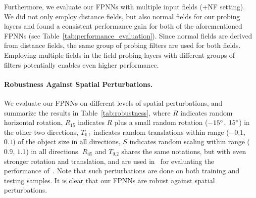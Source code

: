 \documentclass{article}
\begin{document}
Furthermore, we evaluate our FPNNs with multiple input fields (+NF setting). We did not only employ distance fields, but also normal fields for our probing layers and found a consistent performance gain for both of the aforementioned FPNNs (see Table~\ref{tab:performance_evaluation}). Since normal fields are derived from distance fields, the same group of probing filters are used for both fields. Employing multiple fields in the field probing layers with different groups of filters potentially enables even higher performance.

\begin{wraptable}{R}{0.5\linewidth}
\vspace{-0.9cm}
	\begin{center}
	\end{center}
	\vspace{-0.3cm}
	\caption{Performance on different perturbations.}
	\label{tab:robustness}
	\vspace{-0.5cm}
\end{wraptable}

\paragraph{Robustness Against Spatial Perturbations.} We evaluate our FPNNs on different levels of spatial perturbations, and summarize the results in Table~\ref{tab:robustness}, where $R$ indicates random horizontal rotation, $R_{15}$ indicates $R$ plus a small random rotation ($-15\degree$, $15\degree$) in the other two directions, $T_{0.1}$ indicates random translations within range ($-0.1$, $0.1$) of the object size in all directions, $S$ indicates random scaling within range ($0.9$, $1.1$) in all directions. $R_{45}$ and $T_{0.2}$ shares the same notations, but with even stronger rotation and translation, and are used in~\cite{qi2016volumetric} for evaluating the performance of~\cite{WU_CVPR15_3D}. Note that such perturbations are done on both training and testing samples. It is clear that our FPNNs are robust against spatial perturbations.
\end{document}
